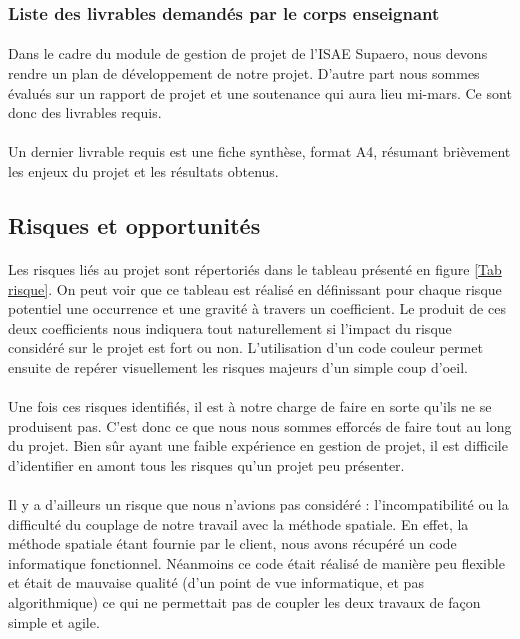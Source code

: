     \subsubsection{Liste des livrables demandés par le corps enseignant}
        \paragraph{}
        Dans le cadre du module de gestion de projet de l'ISAE Supaero, nous devons rendre un plan de développement de notre projet. D'autre part nous sommes évalués sur un rapport de projet et une soutenance qui aura lieu mi-mars. Ce sont donc des livrables requis.

        \paragraph{}
        Un dernier livrable requis est une fiche synthèse, format A4, résumant brièvement les enjeux du projet et les résultats obtenus. 


\subsection{Risques et opportunités}

    \paragraph{}
    Les risques liés au projet sont répertoriés dans le tableau présenté en figure \ref{Tab risque}. On peut voir que ce tableau est réalisé en définissant pour chaque risque potentiel une occurrence et une gravité à travers un coefficient. Le produit de ces deux coefficients nous indiquera tout naturellement si l'impact du risque considéré sur le projet est fort ou non. L'utilisation d'un code couleur permet ensuite de repérer visuellement les risques majeurs d'un simple coup d'oeil.

    \paragraph{}
    Une fois ces risques identifiés, il est à notre charge de faire en sorte qu'ils ne se produisent pas. C'est donc ce que nous nous sommes efforcés de faire tout au long du projet. Bien sûr ayant une faible expérience en gestion de projet, il est difficile d'identifier en amont tous les risques qu'un projet peu présenter.

    \paragraph{}
    Il y a d'ailleurs un risque que nous n'avions pas considéré : l'incompatibilité ou la difficulté du couplage de notre travail avec la méthode spatiale. En effet, la méthode spatiale étant fournie par le client, nous avons récupéré un code informatique fonctionnel. Néanmoins ce code était réalisé de manière peu flexible et était de mauvaise qualité (d'un point de vue informatique, et pas algorithmique) ce qui ne permettait pas de coupler les deux travaux de façon simple et agile.


